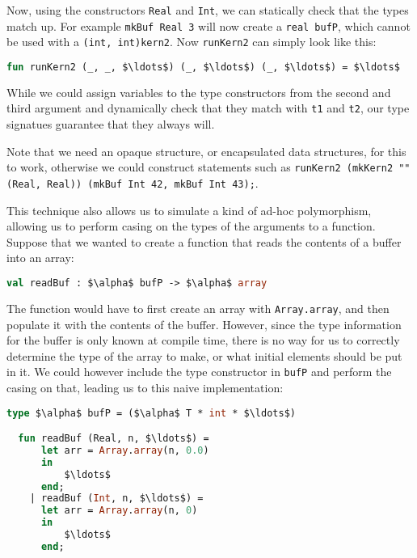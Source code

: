 Now, using the constructors \texttt{Real} and \texttt{Int}, we can
statically check that the types match up. For example \texttt{mkBuf
  Real 3} will now create a \texttt{real bufP}, which cannot be used
with a \texttt{(int, int)kern2}. Now \texttt{runKern2} can simply look
like this:

\begin{lstlisting}[language=ML, caption=runKern2 with type variables,
    label=runKern,mathescape]
  fun runKern2 (_, _, $\ldots$) (_, $\ldots$) (_, $\ldots$) = $\ldots$
\end{lstlisting}

While we could assign variables to the type constructors from the
second and third argument and dynamically check that they match with
\texttt{t1} and \texttt{t2}, our type signatues guarantee that they
always will.

Note that we need an opaque structure, or encapsulated data structures,
for this to work, otherwise we could construct statements such as
\texttt{runKern2 (mkKern2 "" (Real, Real)) (mkBuf Int 42, mkBuf Int
  43);}.

This technique also allows us to simulate a kind of ad-hoc
polymorphism, allowing us to perform casing on the types of the
arguments to a function. Suppose that we wanted to create a function
that reads the contents of a buffer into an array:

\begin{lstlisting}[language=ML, caption=readBuf signature, mathescape]
  val readBuf : $\alpha$ bufP -> $\alpha$ array
\end{lstlisting}

The function would have to first create an array with
\texttt{Array.array}, and then populate it with the contents of the
buffer. However, since the type information for the buffer is only
known at compile time, there is no way for us to correctly determine
the type of the array to make, or what initial elements should be put
in it. We could however include the type constructor in \texttt{bufP}
and perform the casing on that, leading us to this naive
implementation:

\begin{lstlisting}[language=ML, caption=Initial implementation of readBuf,
    mathescape]
  type $\alpha$ bufP = ($\alpha$ T * int * $\ldots$)

  fun readBuf (Real, n, $\ldots$) =
      let arr = Array.array(n, 0.0)
      in
          $\ldots$
      end;
    | readBuf (Int, n, $\ldots$) =
      let arr = Array.array(n, 0)
      in
          $\ldots$
      end;
\end{lstlisting}

